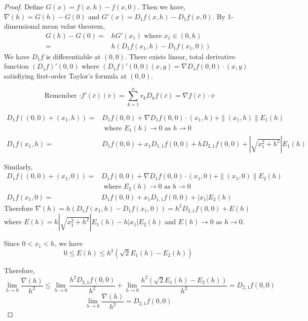 \begin{proof}
Define $G(x) = f(x,h)-f(x,0)$.
Then  we have, $\nabla(h) = G(h)-G(0)$ and $G'(x) = D_1f(x,h) - D_1f(x,0)$.
By 1-dimensional mean value theorem,
\begin{align*}
	G(h)-G(0) = & hG'(x_1)  \text{ where } x_1 \in (0,h) \\
	= & h\left( D_1f(x_1,h)-D_1f(x_1,0)\right)
\end{align*}
We have $D_1 f$ is differentiable at $(0,0)$.
There exists linear, total derivative function $(D_1f)'(0,0)$ where $(D_1f)'(0,0)(x,y) = \nabla D_1 f(0,0) \cdot{} (x,y)$ satisfiying first-order Taylor's formula at $(0,0)$. 
\begin{commentary}
\[ \text{ Remember :} f'(\bar{c})(\bar{v}) = \sum_{k = 1}^n v_k D_k f(\bar{c}) = \nabla f(\bar{c}) \cdot{} \bar{v} \]
\end{commentary}
\begin{align*}
	D_1 f((0,0) + (x_1,h)) = & D_1 f(0,0) + \nabla D_1 f(0,0) \cdot{} (x_1,h) + \|(x_1,h)\| E_1(h) \\
	& \text{ where } E_1(h) \to 0 \text{ as } h \to 0\\
	D_1 f(x_1,h) = & D_1 f(0,0) + x_1 D_{1,1} f(0,0) + h D_{2,1} f(0,0) + \left|\sqrt{x_1^2+h^2}\right| E_1(h)
\end{align*}

Similarly,
\begin{align*}
	D_1 f((0,0) + (x_1,0)) = & D_1 f(0,0) + \nabla D_1 f(0,0) \cdot{} (x_1,0) + \|(x_1,0)\| E_2(h) \\
	& \text{ where } E_2(h) \to 0 \text{ as } h  \to 0 \\
	D_1 f(x_1,0) = & D_1 f(0,0) + x_1 D_{1,1} f(0,0) + |x_1| E_2(h)
\end{align*}
Therefore $\nabla(h) = h (D_1 f(x_1,h) - D_1 f(x_1,0)) = h^2 D_{2,1} f(0,0) + E(h)$ where $E(h) = h|\sqrt{x_1^2+h^2}| E_1(h) - h|x_1|E_2(h)$ and $E(h) \to 0$ as $h \to 0$.

Since $0 < x_1 < h$, we have
$$ 0 \le E(h) \le h^2\left(\sqrt{2}E_1(h)-E_2(h)\right)$$

Therefore,
	$$\lim_{h \to 0} \frac{\nabla(h)}{h^2} \le \lim_{h \to 0} \frac{h^2 D_{2,1} f(0,0)}{h^2} + \lim_{h \to 0} \frac{h^2 (\sqrt{2}E_1(h) - E_2(h))}{h^2} = D_{2,1}f(0,0)$$
\begin{equation}
\lim_{h \to 0} \frac{\nabla(h)}{h^2} = D_{2,1} f(0,0)
\end{equation}


\end{proof}
